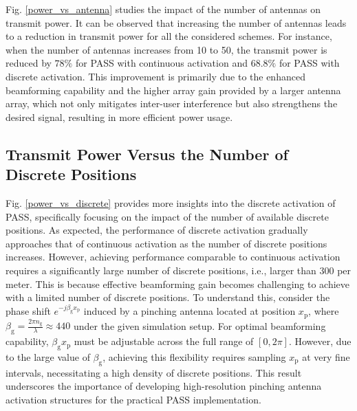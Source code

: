 Fig. \ref{power_vs_antenna} studies the impact of the number of antennas on transmit power. It can be observed that increasing the number of antennas leads to a reduction in transmit power for all the considered schemes. For instance, when the number of antennas increases from 10 to 50, the transmit power is reduced by $78\%$ for PASS with continuous activation and $68.8\%$ for PASS with discrete activation. This improvement is primarily due to the enhanced beamforming capability and the higher array gain provided by a larger antenna array, which not only mitigates inter-user interference but also strengthens the desired signal, resulting in more efficient power usage. 


\subsection{Transmit Power Versus the Number of Discrete Positions}


Fig. \ref{power_vs_discrete} provides more insights into the discrete activation of PASS, specifically focusing on the impact of the number of available discrete positions. As expected, the performance of discrete activation gradually approaches that of continuous activation as the number of discrete positions increases. However, achieving performance comparable to continuous activation requires a significantly large number of discrete positions, i.e., larger than $300$ per meter. This is because effective beamforming gain becomes challenging to achieve with a limited number of discrete positions. To understand this, consider the phase shift $e^{-j \beta_{\mathrm{g}} x_{\mathrm{p}}}$ induced by a pinching antenna located at position $x_{\mathrm{p}}$, where $\beta_{\mathrm{g}} = \frac{2 \pi n_{\mathrm{g}}}{\lambda} \approx 440$ under the given simulation setup. For optimal beamforming capability, $\beta_{\mathrm{g}} x_{\mathrm{p}}$ must be adjustable across the full range of $[0, 2\pi]$. However, due to the large value of $\beta_{\mathrm{g}}$, achieving this flexibility requires sampling $x_{\mathrm{p}}$ at very fine intervals, necessitating a high density of discrete positions. This result underscores the importance of developing high-resolution pinching antenna activation structures for the practical PASS implementation.    